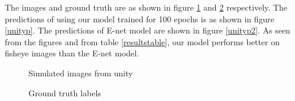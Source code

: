 \documentclass[a4paper, 12pt, oneside, BCOR1cm,toc=chapterentrywithdots]{scrbook}
\begin{document}
The images and ground truth are as shown in figure \ref{unityimages} and \ref{unitygt} respectively. The predictions of using our model trained for 100 epochs is as shown in figure \ref{unityp}. The predictions of E-net model are shown in figure \ref{unityp2}. As seen from the figures and from table \ref{resultstable}, our model performs better on fisheye images than the E-net model.

\begin{figure}[h] 
\caption{Simulated images from unity} \label{unityimages}
\end{figure}

\begin{figure}[h] 
\caption{Ground truth labels} \label{unitygt}
\end{figure}
\end{document}
